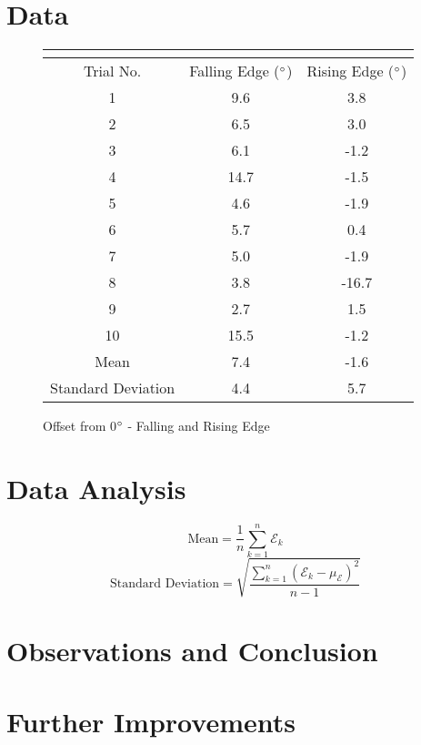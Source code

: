 \documentclass[11pt]{article}
\begin{document}
\section{Data}
\begin{figure}[h!t]
\begin{center}
\caption{Offset from 0$\degree$ - Falling and Rising Edge}
\begin{tabular}{| c | c | c |}
\multicolumn{3}{c}{} \\ \hline
Trial No. & Falling Edge ($\degree$) & Rising Edge ($\degree$) \\ \hline
1 & 9.6 & 3.8 \\ \hline
2 & 6.5 & 3.0 \\ \hline
3 & 6.1 & -1.2 \\ \hline
4 & 14.7 & -1.5 \\ \hline
5 & 4.6 & -1.9 \\ \hline
6 & 5.7 & 0.4 \\ \hline
7 & 5.0 & -1.9 \\ \hline
8 & 3.8 & -16.7 \\ \hline
9 & 2.7 & 1.5 \\ \hline
10 & 15.5 & -1.2 \\ \hline
Mean & 7.4 & -1.6 \\\hline
Standard Deviation & 4.4 & 5.7 \\ \hline
\end{tabular}
\end{center}
\end{figure}
\section{Data Analysis}
\begin{equation}
	\mbox{Mean} = \frac{1}{n} \sum_{k=1}^{n}\mathcal{E}_k
\end{equation}
\begin{equation}
	\mbox{Standard Deviation} = \sqrt{\frac{\sum_{k=1}^{n}(\mathcal{E}_k-\mu_{\mathcal{E}})^2}{n-1}}
\end{equation}
\section{Observations and Conclusion}
\section{Further Improvements}
\end{document}
